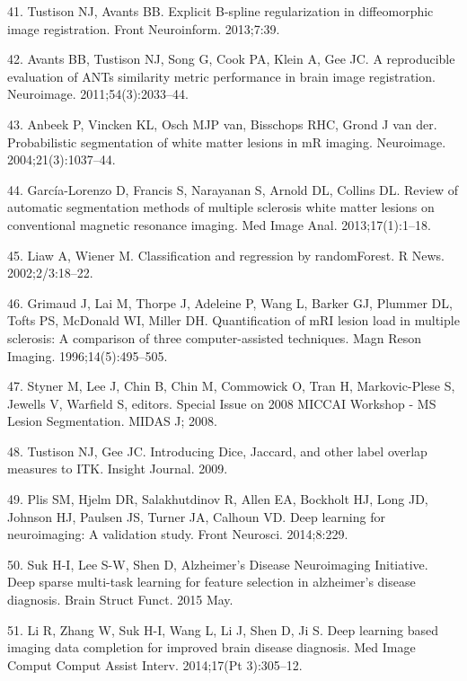 \documentclass[11pt,]{article}
\begin{document}
\hypertarget{ref-Tustison:2013ac}{}
41. Tustison NJ, Avants BB. Explicit B-spline regularization in
diffeomorphic image registration. Front Neuroinform. 2013;7:39.

\hypertarget{ref-Avants:2011ab}{}
42. Avants BB, Tustison NJ, Song G, Cook PA, Klein A, Gee JC. A
reproducible evaluation of ANTs similarity metric performance in brain
image registration. Neuroimage. 2011;54(3):2033--44.

\hypertarget{ref-Anbeek:2004aa}{}
43. Anbeek P, Vincken KL, Osch MJP van, Bisschops RHC, Grond J van der.
Probabilistic segmentation of white matter lesions in mR imaging.
Neuroimage. 2004;21(3):1037--44.

\hypertarget{ref-Garcia-Lorenzo:2013aa}{}
44. García-Lorenzo D, Francis S, Narayanan S, Arnold DL, Collins DL.
Review of automatic segmentation methods of multiple sclerosis white
matter lesions on conventional magnetic resonance imaging. Med Image
Anal. 2013;17(1):1--18.

\hypertarget{ref-liaw2002}{}
45. Liaw A, Wiener M. Classification and regression by randomForest. R
News. 2002;2/3:18--22.

\hypertarget{ref-Grimaud:1996aa}{}
46. Grimaud J, Lai M, Thorpe J, Adeleine P, Wang L, Barker GJ, Plummer
DL, Tofts PS, McDonald WI, Miller DH. Quantification of mRI lesion load
in multiple sclerosis: A comparison of three computer-assisted
techniques. Magn Reson Imaging. 1996;14(5):495--505.

\hypertarget{ref-styner2008}{}
47. Styner M, Lee J, Chin B, Chin M, Commowick O, Tran H, Markovic-Plese
S, Jewells V, Warfield S, editors. Special Issue on 2008 MICCAI Workshop
- MS Lesion Segmentation. MIDAS J; 2008.

\hypertarget{ref-tustison2009}{}
48. Tustison NJ, Gee JC. Introducing Dice, Jaccard, and other label
overlap measures to ITK. Insight Journal. 2009.

\hypertarget{ref-Plis:2014aa}{}
49. Plis SM, Hjelm DR, Salakhutdinov R, Allen EA, Bockholt HJ, Long JD,
Johnson HJ, Paulsen JS, Turner JA, Calhoun VD. Deep learning for
neuroimaging: A validation study. Front Neurosci. 2014;8:229.

\hypertarget{ref-Suk:2015aa}{}
50. Suk H-I, Lee S-W, Shen D, Alzheimer's Disease Neuroimaging
Initiative. Deep sparse multi-task learning for feature selection in
alzheimer's disease diagnosis. Brain Struct Funct. 2015 May.

\hypertarget{ref-Li:2014aa}{}
51. Li R, Zhang W, Suk H-I, Wang L, Li J, Shen D, Ji S. Deep learning
based imaging data completion for improved brain disease diagnosis. Med
Image Comput Comput Assist Interv. 2014;17(Pt 3):305--12.
\end{document}
